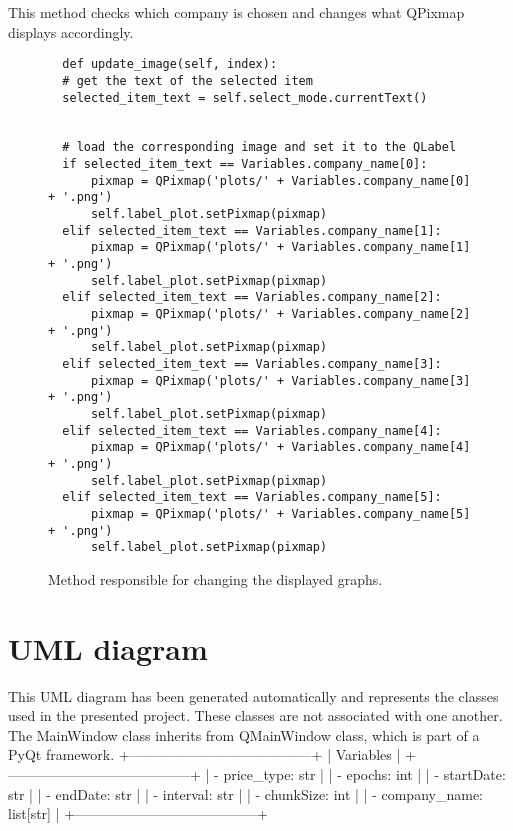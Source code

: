 This method checks which company is chosen and changes what QPixmap displays accordingly.
\clearpage
\begin{figure}
\centering
\begin{lstlisting}
  def update_image(self, index):
  # get the text of the selected item
  selected_item_text = self.select_mode.currentText()


  # load the corresponding image and set it to the QLabel
  if selected_item_text == Variables.company_name[0]:
      pixmap = QPixmap('plots/' + Variables.company_name[0] + '.png')
      self.label_plot.setPixmap(pixmap)
  elif selected_item_text == Variables.company_name[1]:
      pixmap = QPixmap('plots/' + Variables.company_name[1] + '.png')
      self.label_plot.setPixmap(pixmap)
  elif selected_item_text == Variables.company_name[2]:
      pixmap = QPixmap('plots/' + Variables.company_name[2] + '.png')
      self.label_plot.setPixmap(pixmap)
  elif selected_item_text == Variables.company_name[3]:
      pixmap = QPixmap('plots/' + Variables.company_name[3] + '.png')
      self.label_plot.setPixmap(pixmap)
  elif selected_item_text == Variables.company_name[4]:
      pixmap = QPixmap('plots/' + Variables.company_name[4] + '.png')
      self.label_plot.setPixmap(pixmap)
  elif selected_item_text == Variables.company_name[5]:
      pixmap = QPixmap('plots/' + Variables.company_name[5] + '.png')
      self.label_plot.setPixmap(pixmap)
\end{lstlisting}
\caption{Method responsible for changing the displayed graphs.}
\label{fig:pseudocode:listings}
\end{figure}

\section*{UML diagram}
This UML diagram has been generated automatically and represents the classes used in the presented project. These classes are not associated with one another. The MainWindow class inherits from QMainWindow class, which is part of a PyQt framework.
+---------------------------------------+
|               Variables               |
+---------------------------------------+
| - price{\_}type: str                     |
| - epochs: int                         |
| - startDate: str                      |
| - endDate: str                        |
| - interval: str                       |
| - chunkSize: int                      |
| - company{\_}name: list[str]             |
+---------------------------------------+


